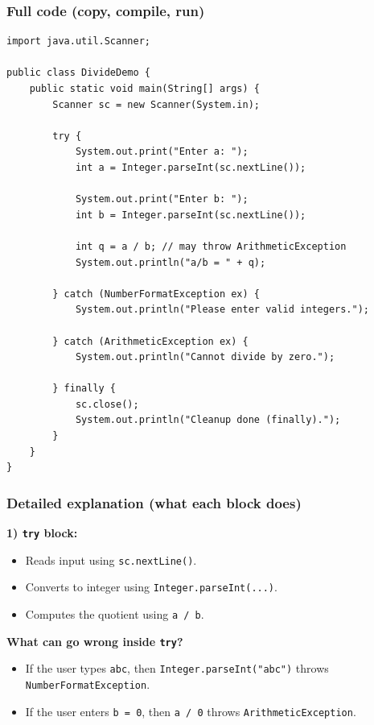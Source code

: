 \documentclass[11pt]{article}
\begin{document}
\subsubsection*{Full code (copy, compile, run)}
\begin{lstlisting}
import java.util.Scanner;

public class DivideDemo {
    public static void main(String[] args) {
        Scanner sc = new Scanner(System.in);

        try {
            System.out.print("Enter a: ");
            int a = Integer.parseInt(sc.nextLine());

            System.out.print("Enter b: ");
            int b = Integer.parseInt(sc.nextLine());

            int q = a / b; // may throw ArithmeticException
            System.out.println("a/b = " + q);

        } catch (NumberFormatException ex) {
            System.out.println("Please enter valid integers.");

        } catch (ArithmeticException ex) {
            System.out.println("Cannot divide by zero.");

        } finally {
            sc.close();
            System.out.println("Cleanup done (finally).");
        }
    }
}
\end{lstlisting}

\subsubsection*{Detailed explanation (what each block does)}
\textbf{1) \texttt{try} block:}
\begin{itemize}
  \item Reads input using \texttt{sc.nextLine()}.
  \item Converts to integer using \texttt{Integer.parseInt(...)}.
  \item Computes the quotient using \texttt{a / b}.
\end{itemize}

\textbf{What can go wrong inside \texttt{try}?}
\begin{itemize}
  \item If the user types \texttt{abc}, then \texttt{Integer.parseInt("abc")} throws \texttt{NumberFormatException}.
  \item If the user enters \texttt{b = 0}, then \texttt{a / 0} throws \texttt{ArithmeticException}.
\end{itemize}
\end{document}
